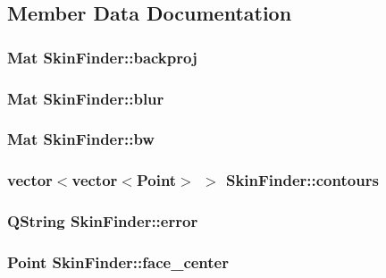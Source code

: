 \subsection{Member Data Documentation}
\hypertarget{class_skin_finder_aed495dc76d3c5f96eb97805d49923e59}{
\subsubsection[{backproj}]{\setlength{\rightskip}{0pt plus 5cm}Mat {\bf SkinFinder::backproj}}}
\label{class_skin_finder_aed495dc76d3c5f96eb97805d49923e59}
\hypertarget{class_skin_finder_abc551e869a5beddbc7d4c956653d414e}{
\subsubsection[{blur}]{\setlength{\rightskip}{0pt plus 5cm}Mat {\bf SkinFinder::blur}}}
\label{class_skin_finder_abc551e869a5beddbc7d4c956653d414e}
\hypertarget{class_skin_finder_a325d75cde01cb02243af4dee842f6512}{
\subsubsection[{bw}]{\setlength{\rightskip}{0pt plus 5cm}Mat {\bf SkinFinder::bw}}}
\label{class_skin_finder_a325d75cde01cb02243af4dee842f6512}
\hypertarget{class_skin_finder_a6921f1002639c7a369f637b229de376a}{
\subsubsection[{contours}]{\setlength{\rightskip}{0pt plus 5cm}vector$<$vector$<$Point$>$ $>$ {\bf SkinFinder::contours}}}
\label{class_skin_finder_a6921f1002639c7a369f637b229de376a}
\hypertarget{class_skin_finder_a6487c08c34a8330230b06918c89bbd4d}{
\subsubsection[{error}]{\setlength{\rightskip}{0pt plus 5cm}QString {\bf SkinFinder::error}}}
\label{class_skin_finder_a6487c08c34a8330230b06918c89bbd4d}
\hypertarget{class_skin_finder_a55330ad48d6c72f9a0f9d16a874b39ce}{
\subsubsection[{face\_\-center}]{\setlength{\rightskip}{0pt plus 5cm}Point {\bf SkinFinder::face\_\-center}}}
